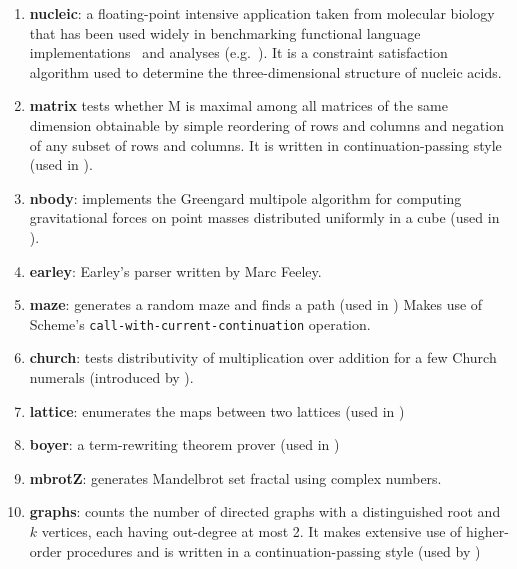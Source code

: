 \documentclass[preprint,onecolumn,9pt]{sigplanconf} %
\begin{document}
\begin{enumerate}  %

\item {\bf nucleic}: a floating-point intensive application taken from
  molecular biology that has been used widely in benchmarking
  functional language
  implementations~\cite{dvanhorn:Hartel1996Benchmarking} and analyses
  (e.g.~\cite{dvanhorn:wright-jagannathan-toplas98,dvanhorn:jagannathan-etal-popl98}).
  It is a constraint satisfaction algorithm used to determine the
  three-dimensional structure of nucleic acids.

\item {\bf matrix} tests whether M is maximal among all matrices of
  the same dimension obtainable by simple reordering of rows and
  columns and negation of any subset of rows and columns.  It is
  written in continuation-passing style (used in
  \cite{dvanhorn:wright-jagannathan-toplas98,dvanhorn:jagannathan-etal-popl98}).


\item {\bf nbody}: implements the Greengard multipole algorithm for
  computing gravitational forces on point masses distributed uniformly
  in a cube (used in
  \cite{dvanhorn:wright-jagannathan-toplas98,dvanhorn:jagannathan-etal-popl98}).

\item {\bf earley}:  Earley's parser written by Marc Feeley.

\item {\bf maze}: generates a random maze and finds a path (used in
  \cite{dvanhorn:wright-jagannathan-toplas98,dvanhorn:jagannathan-etal-popl98})
  Makes use of Scheme's {\tt call-with-current-continuation}
  operation.

\item {\bf church}: tests distributivity of multiplication over
  addition for a few Church numerals (introduced by
  \cite{dvanhorn:Vardoulakis2011CFA2}).

\item {\bf lattice}: enumerates the maps between two lattices (used in
  \cite{dvanhorn:wright-jagannathan-toplas98,dvanhorn:jagannathan-etal-popl98})

\item {\bf boyer}: a term-rewriting theorem prover (used in
  \cite{dvanhorn:wright-jagannathan-toplas98,dvanhorn:jagannathan-etal-popl98})

\item {\bf mbrotZ}: generates Mandelbrot set fractal using complex
  numbers.

\item {\bf graphs}: counts the number of directed graphs with a
  distinguished root and \(k\) vertices, each having out-degree at
  most 2. It makes extensive use of higher-order procedures and is
  written in a continuation-passing style (used by
  \cite{dvanhorn:wright-jagannathan-toplas98,dvanhorn:jagannathan-etal-popl98})

\end{enumerate}
\end{document}
